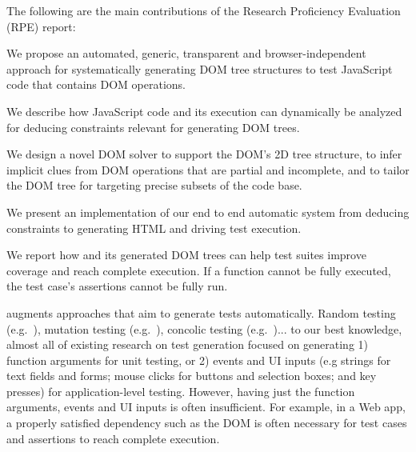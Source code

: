 The following are the main contributions of the Research Proficiency Evaluation (RPE) report:
\begin {compactitem}
\item We propose an automated, generic, transparent and browser-independent approach for systematically generating DOM tree structures to test JavaScript code that contains DOM operations.
\item We describe how JavaScript code and its execution can dynamically be analyzed for deducing constraints relevant for generating DOM trees.
\item We design a novel DOM solver to support the DOM's 2D tree structure, to infer implicit clues from DOM operations that are partial and incomplete, and to tailor the DOM tree for targeting precise subsets of the code base.
\item We present an implementation of our end to end automatic system from deducing constraints to generating HTML and driving test execution.
\item We report how \tool and its generated DOM trees can help test suites improve coverage and reach complete execution.  If a function cannot be fully executed, the test case's assertions cannot be fully run.  
\end {compactitem}

\tool augments approaches that aim to generate tests automatically.  
Random testing (e.g.~\cite{artemis}), mutation testing (e.g.~\cite{pythia}), concolic testing (e.g.~\cite{eventConcolic, feedbackConcolic, kudzu, jalangi, cute})... 
to our best knowledge, almost all of existing research on test generation focused on generating 1) function arguments for unit testing, or 2) events and UI inputs (e.g strings for text fields and forms; mouse clicks for buttons and selection boxes; and key presses) for application-level testing.  
However, having just the function arguments, events and UI inputs is often insufficient.  
For example, in a Web app, a properly satisfied dependency such as the DOM is often necessary for test cases and assertions to reach complete execution.  



